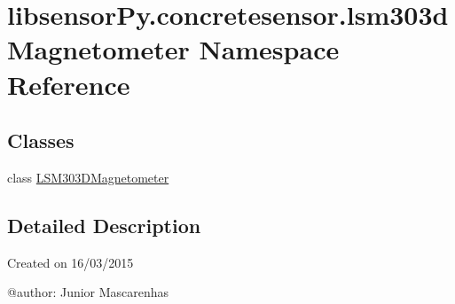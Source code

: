 \hypertarget{namespacelibsensorPy_1_1concretesensor_1_1lsm303dMagnetometer}{}\section{libsensor\+Py.\+concretesensor.\+lsm303d\+Magnetometer Namespace Reference}
\label{namespacelibsensorPy_1_1concretesensor_1_1lsm303dMagnetometer}
\subsection*{Classes}
\begin{DoxyCompactItemize}
\item 
class \hyperlink{classlibsensorPy_1_1concretesensor_1_1lsm303dMagnetometer_1_1LSM303DMagnetometer}{L\+S\+M303\+D\+Magnetometer}
\end{DoxyCompactItemize}


\subsection{Detailed Description}
\begin{DoxyVerb}Created on 16/03/2015

@author: Junior Mascarenhas
\end{DoxyVerb}
 